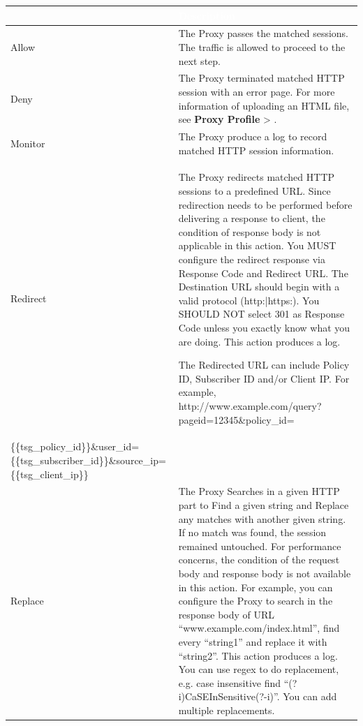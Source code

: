\begin{longtable}{p{}|p{}}   
    \rowcolor{black}\multicolumn{1}{l!{\color{white}\vrule width 0.5pt}}{\textcolor{white}{Action}}  & \textcolor{white}{Description} \\\hline                                                                                                                                                          
    Allow & The Proxy passes the matched sessions. The traffic is allowed to proceed to the next step.\\ \hline                                                                                                            
    Deny & The Proxy terminated matched HTTP session with an error page. For more information of uploading an HTML file, 
    see \textbf{Proxy Profile} > \textbf{\hyperlink{link:Response Pages}{\color{linkblue}{Response Pages}}}.\\ \hline                                                                                                           
    Monitor &  The Proxy produce a log to record matched HTTP session information.\\\hline 
    Redirect &  The Proxy redirects matched HTTP sessions to a predefined URL. Since redirection
                                needs to be performed before delivering a response to client, the condition of response body is not
                                applicable in this action. You MUST configure the redirect response via Response Code and Redirect
                                URL. The Destination URL should begin with a valid protocol (http:|https:). You SHOULD NOT select
                                301 as Response Code unless you exactly know what you are doing. This action produces a log.


                                The Redirected URL can include Policy ID, Subscriber ID and/or Client IP. 
                                For example, http://www.example.com/query?pageid=12345\&policy\_id=\\
                                \{\{tsg\_policy\_id\}\}\&user\_id=\{\{tsg\_subscriber\_id\}\}\&source\_ip=\{\{tsg\_client\_ip\}\} \\\hline 
    Replace &  The Proxy Searches in a given HTTP part to Find a given string and Replace any matches with another given string. 
    If no match was found, the session remained untouched. For performance concerns, the condition of the request body and response body is not available in this action. 
    For example, you can configure the Proxy to search in the response body of URL “www.example.com/index.html”, find every “string1” and replace it with “string2”. 
    This action produces a log. You can use regex to do replacement, e.g. case insensitive find “(?i)CaSEInSensitive(?-i)”. You can add multiple replacements.



\end{longtable}
